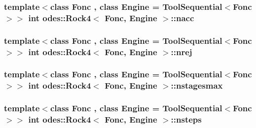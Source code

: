 \hypertarget{classodes_1_1Rock4_af33e626e975c3ea92a6d33962773ccb9}{
\subsubsection[{nacc}]{\setlength{\rightskip}{0pt plus 5cm}template$<$class Fonc , class Engine  = Tool\-Sequential$<$\-Fonc$>$$>$ int {\bf odes\-::\-Rock4}$<$ Fonc, Engine $>$\-::nacc\hspace{0.3cm}{\ttfamily [private]}}}\label{classodes_1_1Rock4_af33e626e975c3ea92a6d33962773ccb9}
\hypertarget{classodes_1_1Rock4_ab63364c94fc6901269c195c0d7a0565b}{
\subsubsection[{nrej}]{\setlength{\rightskip}{0pt plus 5cm}template$<$class Fonc , class Engine  = Tool\-Sequential$<$\-Fonc$>$$>$ int {\bf odes\-::\-Rock4}$<$ Fonc, Engine $>$\-::nrej\hspace{0.3cm}{\ttfamily [private]}}}\label{classodes_1_1Rock4_ab63364c94fc6901269c195c0d7a0565b}
\hypertarget{classodes_1_1Rock4_a362d2c3d57d65fdaf5af1e03befc34f9}{
\subsubsection[{nstagesmax}]{\setlength{\rightskip}{0pt plus 5cm}template$<$class Fonc , class Engine  = Tool\-Sequential$<$\-Fonc$>$$>$ int {\bf odes\-::\-Rock4}$<$ Fonc, Engine $>$\-::nstagesmax\hspace{0.3cm}{\ttfamily [private]}}}\label{classodes_1_1Rock4_a362d2c3d57d65fdaf5af1e03befc34f9}
\hypertarget{classodes_1_1Rock4_a598d53853fcd0955898167560d060ee2}{
\subsubsection[{nsteps}]{\setlength{\rightskip}{0pt plus 5cm}template$<$class Fonc , class Engine  = Tool\-Sequential$<$\-Fonc$>$$>$ int {\bf odes\-::\-Rock4}$<$ Fonc, Engine $>$\-::nsteps\hspace{0.3cm}{\ttfamily [private]}}}\label{classodes_1_1Rock4_a598d53853fcd0955898167560d060ee2}
